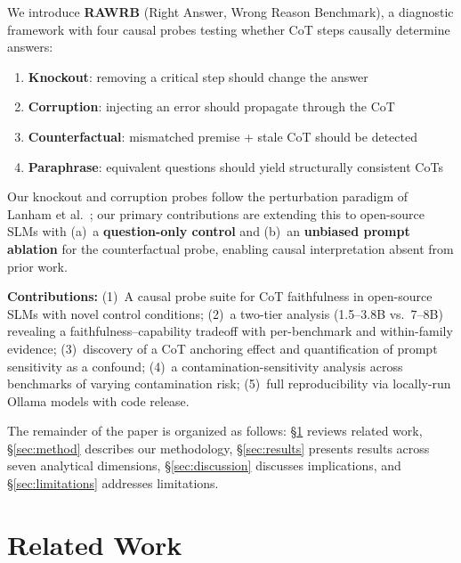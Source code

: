 \documentclass[11pt]{article}
\begin{document}
We introduce \textbf{RAWRB} (Right Answer, Wrong Reason Benchmark), a diagnostic framework with four causal probes testing whether CoT steps causally determine answers:
\begin{enumerate}
    \item \textbf{Knockout}: removing a critical step should change the answer
    \item \textbf{Corruption}: injecting an error should propagate through the CoT
    \item \textbf{Counterfactual}: mismatched premise + stale CoT should be detected
    \item \textbf{Paraphrase}: equivalent questions should yield structurally consistent CoTs
\end{enumerate}
Our knockout and corruption probes follow the perturbation paradigm of Lanham et al.~\cite{lanham2023measuring}; our primary contributions are extending this to open-source SLMs with (a)~a \textbf{question-only control} and (b)~an \textbf{unbiased prompt ablation} for the counterfactual probe, enabling causal interpretation absent from prior work.

\noindent\textbf{Contributions:} (1)~A causal probe suite for CoT faithfulness in open-source SLMs with novel control conditions; (2)~a two-tier analysis (1.5--3.8B vs.\ 7--8B) revealing a faithfulness--capability tradeoff with per-benchmark and within-family evidence; (3)~discovery of a CoT anchoring effect and quantification of prompt sensitivity as a confound; (4)~a contamination-sensitivity analysis across benchmarks of varying contamination risk; (5)~full reproducibility via locally-run Ollama models with code release.

The remainder of the paper is organized as follows: \S\ref{sec:related} reviews related work, \S\ref{sec:method} describes our methodology, \S\ref{sec:results} presents results across seven analytical dimensions, \S\ref{sec:discussion} discusses implications, and \S\ref{sec:limitations} addresses limitations.

\section{Related Work}
\label{sec:related}
\end{document}

